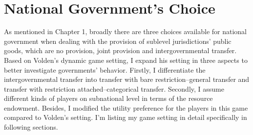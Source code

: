 




\section{National Government's Choice}
As mentioned in Chapter 1, broadly there are three choices available for national government when dealing with the provision of sublevel jurisdictions' public goods, which are no provision, joint provision and intergovernmental transfer. Based on Volden's \cite{volden2007intergovernmental} dynamic game setting, I expand his setting in three aspects to better investigate governments' behavior. Firstly, I differentiate the intergovernmental transfer into transfer with bare restriction--general transfer and transfer with restriction attached--categorical transfer. Secondly, I assume different kinds of players on subnational level in terms of the resource endowment. Besides, I modified the utility preference for the players in this game compared to Volden's setting. I'm listing my game setting in detail specifically in following sections.

